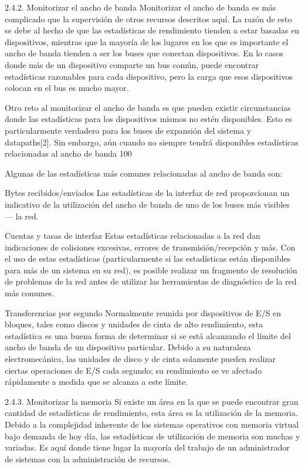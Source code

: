 \documentclass[12pt]{article}
\begin{document}
\begin{itemize}
2.4.2. Monitorizar el ancho de banda
Monitorizar el ancho de banda es más complicado que la supervisión de otros recursos descritos aquí. La razón de esto se debe al hecho de que las estadísticas de rendimiento tienden a estar basadas en dispositivos, mientras que la mayoría de los lugares en los que es importante el ancho de banda tienden a ser los buses que conectan dispositivos. En lo casos donde más de un dispositivo comparte un bus común, puede encontrar estadísticas razonables para cada dispositivo, pero la carga que esos dispositivos colocan en el bus es mucho mayor.

Otro reto al monitorizar el ancho de banda es que pueden existir circunstancias donde las estadísticas para los dispositivos mismos no estén disponibles. Esto es particularmente verdadero para los buses de expansión del sistema y datapaths[2]. Sin embargo, aún cuando no siempre tendrá disponibles estadísticas relacionadas al ancho de banda 100%

Algunas de las estadísticas más comunes relacionadas al ancho de banda son:

Bytes recibidos/enviados
Las estadísticas de la interfaz de red proporcionan un indicativo de la utilización del ancho de banda de uno de los buses más visibles — la red.

Cuentas y tasas de interfaz
Estas estadísticas relacionadas a la red dan indicaciones de colisiones excesivas, errores de transmisión/recepción y más. Con el uso de estas estadísticas (particularmente si las estadísticas están disponibles para más de un sistema en su red), es posible realizar un fragmento de resolución de problemas de la red antes de utilizar las herramientas de diagnóstico de la red más comunes.

Transferencias por segundo
Normalmente reunida por dispositivos de E/S en bloques, tales como discos y unidades de cinta de alto rendimiento, esta estadística es una buena forma de determinar si se está alcanzando el límite del ancho de banda de un dispositivo particular. Debido a su naturaleza electromecánica, las unidades de disco y de cinta solamente pueden realizar ciertas operaciones de E/S cada segundo; su rendimiento se ve afectado rápidamente a medida que se alcanza a este límite.

2.4.3. Monitorizar la memoria
Si existe un área en la que se puede encontrar gran cantidad de estadísticas de rendimiento, esta área es la utilización de la memoria. Debido a la complejidad inherente de los sistemas operativos con memoria virtual bajo demanda de hoy día, las estadísticas de utilización de memoria son muchas y variadas. Es aquí donde tiene lugar la mayoría del trabajo de un administrador de sistemas con la administración de recursos.


\end{itemize}
\end{document}
